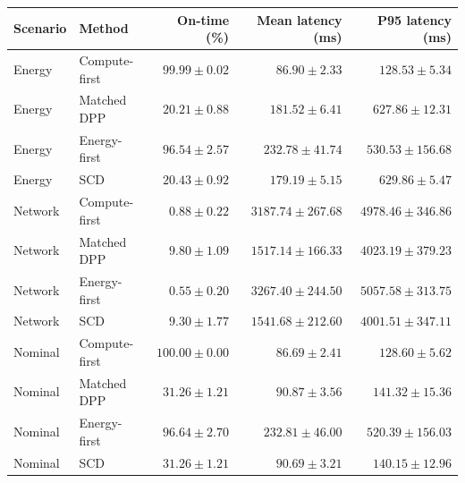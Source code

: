 \begin{tabular}{@{}llrrr@{}}
\toprule
Scenario & Method & On-time (\%) & Mean latency (ms) & P95 latency (ms)\\
\midrule
Energy & Compute-first & $99.99\pm0.02$ & $86.90\pm2.33$ & $128.53\pm5.34$\\
Energy & Matched DPP & $20.21\pm0.88$ & $181.52\pm6.41$ & $627.86\pm12.31$\\
Energy & Energy-first & $96.54\pm2.57$ & $232.78\pm41.74$ & $530.53\pm156.68$\\
Energy & SCD & $20.43\pm0.92$ & $179.19\pm5.15$ & $629.86\pm5.47$\\
Network & Compute-first & $0.88\pm0.22$ & $3187.74\pm267.68$ & $4978.46\pm346.86$\\
Network & Matched DPP & $9.80\pm1.09$ & $1517.14\pm166.33$ & $4023.19\pm379.23$\\
Network & Energy-first & $0.55\pm0.20$ & $3267.40\pm244.50$ & $5057.58\pm313.75$\\
Network & SCD & $9.30\pm1.77$ & $1541.68\pm212.60$ & $4001.51\pm347.11$\\
Nominal & Compute-first & $100.00\pm0.00$ & $86.69\pm2.41$ & $128.60\pm5.62$\\
Nominal & Matched DPP & $31.26\pm1.21$ & $90.87\pm3.56$ & $141.32\pm15.36$\\
Nominal & Energy-first & $96.64\pm2.70$ & $232.81\pm46.00$ & $520.39\pm156.03$\\
Nominal & SCD & $31.26\pm1.21$ & $90.69\pm3.21$ & $140.15\pm12.96$\\
\bottomrule
\end{tabular}
